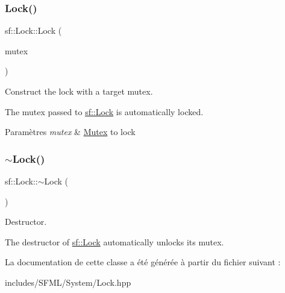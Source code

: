 \subsubsection{\texorpdfstring{Lock()}{Lock()}}
{\footnotesize\ttfamily sf\+::\+Lock\+::\+Lock (\begin{DoxyParamCaption}\item[{\hyperlink{classsf_1_1Mutex}{Mutex} \&}]{mutex }\end{DoxyParamCaption})\hspace{0.3cm}{\ttfamily [explicit]}}



Construct the lock with a target mutex. 

The mutex passed to \hyperlink{classsf_1_1Lock}{sf\+::\+Lock} is automatically locked.


\begin{DoxyParams}{Paramètres}
{\em mutex} & \hyperlink{classsf_1_1Mutex}{Mutex} to lock \\
\hline
\end{DoxyParams}
\mbox{\label{classsf_1_1Lock_a8168b36323a18ccf5b6bc531d964aec5}} 
\subsubsection{\texorpdfstring{$\sim$\+Lock()}{~Lock()}}
{\footnotesize\ttfamily sf\+::\+Lock\+::$\sim$\+Lock (\begin{DoxyParamCaption}{ }\end{DoxyParamCaption})}



Destructor. 

The destructor of \hyperlink{classsf_1_1Lock}{sf\+::\+Lock} automatically unlocks its mutex. 

La documentation de cette classe a été générée à partir du fichier suivant \+:\begin{DoxyCompactItemize}
\item 
includes/\+S\+F\+M\+L/\+System/Lock.\+hpp\end{DoxyCompactItemize}
